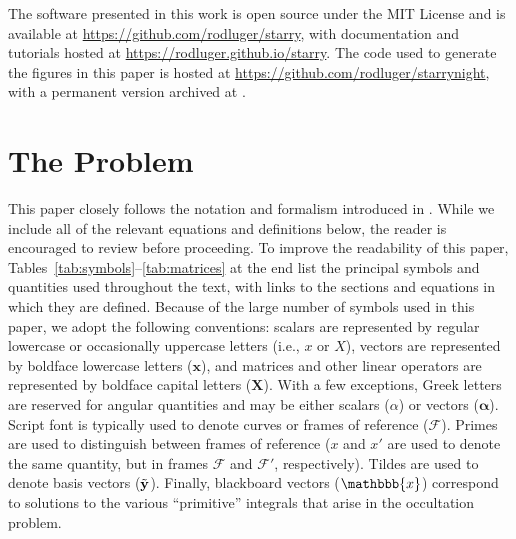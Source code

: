 \documentclass[modern]{aastex62}
\begin{document}
\vspace{1em}

The software presented in this work is open source under the MIT License and
is available at \url{https://github.com/rodluger/starry}, with documentation
and tutorials hosted at \url{https://rodluger.github.io/starry}.
The code used to generate the figures in this paper is hosted
at \url{https://github.com/rodluger/starrynight}, with a permanent
version archived at .





\appendix

%

\section{The Problem}
\label{sec:the-problem}
%
This paper closely follows the
notation and formalism introduced in \citet{Luger2019}. While we
include all of the relevant equations and definitions below,
the reader is encouraged to
review \citet{Luger2019} before proceeding.
To improve the readability of this paper,
Tables~\ref{tab:symbols}--\ref{tab:matrices} at the end list the principal
symbols and quantities used throughout the text, with links to the
sections and equations in which they are defined.
Because of the large number of symbols used in this paper, we adopt
the following conventions: scalars are represented by regular lowercase or
occasionally uppercase letters (i.e., $x$ or $X$), vectors are
represented by boldface lowercase letters
($\mathbf{x}$), and matrices and other linear operators are represented
by boldface capital letters ($\mathbf{X}$).
With a few exceptions,
Greek letters are reserved for angular quantities and may be either
scalars ($\alpha$) or vectors ($\pmb{\alpha}$).
Script font is typically used to denote curves or frames of reference
($\mathcal{F}$). Primes are used to
distinguish between frames of reference ($x$ and $x'$ are used
to denote the same quantity, but in frames $\mathcal{F}$ and $\mathcal{F}'$,
respectively). Tildes are used to denote basis vectors ($\tilde{\mathbf{y}}$). Finally,
blackboard vectors ($\mathbbb{x}$) correspond to solutions
to the various ``primitive'' integrals that arise in the occultation
problem.
\end{document}
